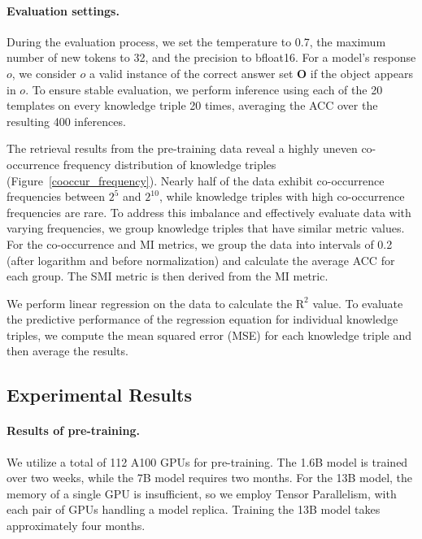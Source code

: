 \paragraph{Evaluation settings.} 
During the evaluation process, we set the temperature to 0.7, the maximum number of new tokens to 32, and the precision to bfloat16. For a model’s response $o$, we consider $o$ a valid instance of the correct answer set \(\mathbf{O}\) if the object appears in $o$. To ensure stable evaluation, we perform inference using each of the 20 templates on every knowledge triple 20 times, averaging the ACC over the resulting 400 inferences.

The retrieval results from the pre-training data reveal a highly uneven co-occurrence frequency distribution of knowledge triples (Figure~\ref{cooccur_frequency}). Nearly half of the data exhibit co-occurrence frequencies between $2^5$ and $2^{10}$, while knowledge triples with high co-occurrence frequencies are rare. To address this imbalance and effectively evaluate data with varying frequencies, we group knowledge triples that have similar metric values. For the co-occurrence and MI metrics, we group the data into intervals of 0.2 (after logarithm and before normalization) and calculate the average ACC for each group. The SMI metric is then derived from the MI metric.

We perform linear regression on the data to calculate the $\text{R}^2$ value. To evaluate the predictive performance of the regression equation for individual knowledge triples, we compute the mean squared error (MSE) for each knowledge triple and then average the results.


% 

\subsection{Experimental Results}
\label{experimental_results}

\paragraph{Results of pre-training.}
We utilize a total of 112 A100 GPUs for pre-training. The 1.6B model is trained over two weeks, while the 7B model requires two months. For the 13B model, the memory of a single GPU is insufficient, so we employ Tensor Parallelism, with each pair of GPUs handling a model replica. Training the 13B model takes approximately four months.

